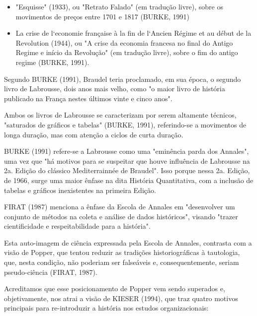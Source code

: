 \begin{itemize}
\item "Esquisse" (1933), ou "Retrato Falado" (em tradução livre), sobre os movimentos de preços entre 1701 e 1817  (BURKE, 1991)
\item La crise de l`economie française à la fin de l`Ancien Régime et au début de la Revolution (1944), ou "A crise da economia francesa no final do Antigo Regime e início da Revolução" (em tradução livre), sobre o fim do antigo regime  (BURKE, 1991).
\end{itemize}

Segundo  BURKE (1991), Braudel teria proclamado, em sua época, o segundo livro de Labrousse, dois anos mais velho, como "o maior livro de história publicado na França nestes últimos vinte e cinco anos".

Ambos os livros de Labrousse se caracterizam por serem altamente técnicos, "saturados de gráficos e tabelas"  (BURKE, 1991), referindo-se a movimentos de longa duração, mas com atenção a ciclos de curta duração.

BURKE (1991) refere-se a Labrousse como uma "eminência parda dos Annales", uma vez que "há motivos para se suspeitar que houve influência de Labrousse na 2a. Edição do clássico Mediterrainnée de Braudel". Isso porque nessa 2a. Edição, de 1966, surge uma maior ênfase na dita História Quantitativa, com a inclusão de tabelas e gráficos inexistentes na primeira Edição.

FIRAT (1987) menciona a ênfase da Escola de Annales em "desenvolver um conjunto de métodos na coleta e análise de dados históricos", visando "trazer cientificidade e respeitabilidade para a história".

Esta auto-imagem de ciência expressada pela Escola de Annales, contrasta com a visão de Popper, que tentou reduzir as tradições historiográficas à tautologia, que, nesta condição, não poderiam ser falseáveis e, consequentemente, seriam pseudo-ciência  (FIRAT, 1987).

Acreditamos que esse posicionamento de Popper vem sendo superados e, objetivamente, nos atrai a visão de KIESER (1994), que traz quatro motivos principais para re-introduzir a história nos estudos organizacionais:


